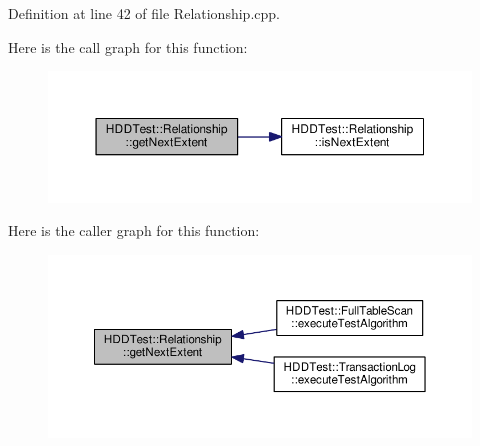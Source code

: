 Definition at line 42 of file Relationship.\-cpp.



Here is the call graph for this function\-:\nopagebreak
\begin{figure}[H]
\begin{center}
\leavevmode
\includegraphics[width=350pt]{class_h_d_d_test_1_1_relationship_a8e9549c7ca201f7b3bf0efec375c52e2_cgraph}
\end{center}
\end{figure}




Here is the caller graph for this function\-:
\nopagebreak
\begin{figure}[H]
\begin{center}
\leavevmode
\includegraphics[width=350pt]{class_h_d_d_test_1_1_relationship_a8e9549c7ca201f7b3bf0efec375c52e2_icgraph}
\end{center}
\end{figure}


